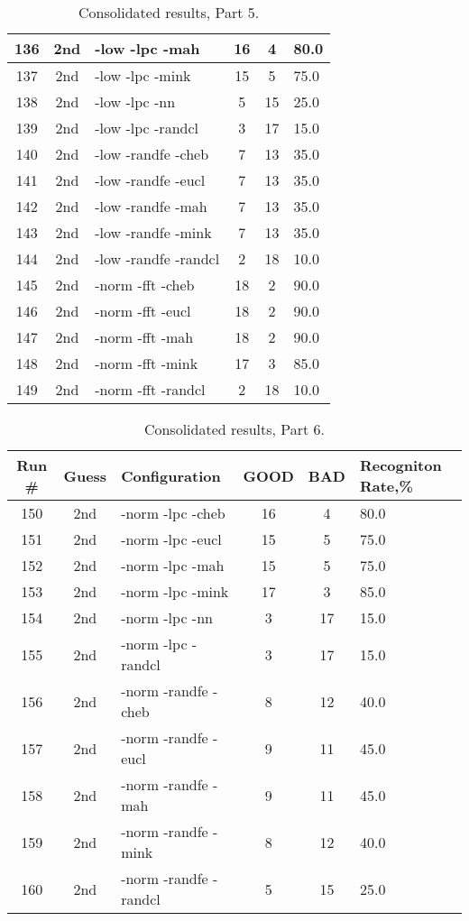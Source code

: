 \begin{table}
\begin{tabular}{|c|c|l|c|c|l|}
136 & 2nd & -low -lpc -mah & 16 & 4 & 80.0\\ \hline
137 & 2nd & -low -lpc -mink & 15 & 5 & 75.0\\ \hline
138 & 2nd & -low -lpc -nn & 5 & 15 & 25.0\\ \hline
139 & 2nd & -low -lpc -randcl & 3 & 17 & 15.0\\ \hline
140 & 2nd & -low -randfe -cheb & 7 & 13 & 35.0\\ \hline
141 & 2nd & -low -randfe -eucl & 7 & 13 & 35.0\\ \hline
142 & 2nd & -low -randfe -mah & 7 & 13 & 35.0\\ \hline
143 & 2nd & -low -randfe -mink & 7 & 13 & 35.0\\ \hline
144 & 2nd & -low -randfe -randcl & 2 & 18 & 10.0\\ \hline
145 & 2nd & -norm -fft -cheb & 18 & 2 & 90.0\\ \hline
146 & 2nd & -norm -fft -eucl & 18 & 2 & 90.0\\ \hline
147 & 2nd & -norm -fft -mah & 18 & 2 & 90.0\\ \hline
148 & 2nd & -norm -fft -mink & 17 & 3 & 85.0\\ \hline
149 & 2nd & -norm -fft -randcl & 2 & 18 & 10.0\\ \hline
\end{tabular}
\caption{Consolidated results, Part 5.}
\label{tab:results}
\end{table}

\begin{table}
\centering
\begin{tabular}{|c|c|l|c|c|l|} \hline
Run \# & Guess & Configuration & GOOD & BAD & Recogniton Rate,\%\\ \hline\hline
150 & 2nd & -norm -lpc -cheb & 16 & 4 & 80.0\\ \hline
151 & 2nd & -norm -lpc -eucl & 15 & 5 & 75.0\\ \hline
152 & 2nd & -norm -lpc -mah & 15 & 5 & 75.0\\ \hline
153 & 2nd & -norm -lpc -mink & 17 & 3 & 85.0\\ \hline
154 & 2nd & -norm -lpc -nn & 3 & 17 & 15.0\\ \hline
155 & 2nd & -norm -lpc -randcl & 3 & 17 & 15.0\\ \hline
156 & 2nd & -norm -randfe -cheb & 8 & 12 & 40.0\\ \hline
157 & 2nd & -norm -randfe -eucl & 9 & 11 & 45.0\\ \hline
158 & 2nd & -norm -randfe -mah & 9 & 11 & 45.0\\ \hline
159 & 2nd & -norm -randfe -mink & 8 & 12 & 40.0\\ \hline
160 & 2nd & -norm -randfe -randcl & 5 & 15 & 25.0\\ \hline
\end{tabular}
\caption{Consolidated results, Part 6.}
\label{tab:results}
\end{table}

